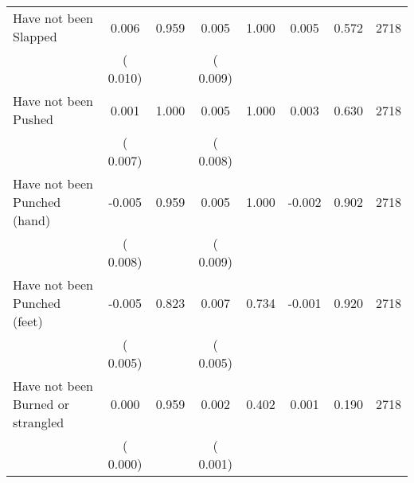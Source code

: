 \begin{tabular}{l*{7}{c}}
 Have not been Slapped       &              0.006       &        0.959  &              0.005       &        1.000  &              0.005       &              0.572 &  2718 \\ 
                       &       (       0.010)             &                               &       (       0.009)                     &                               &                                               &                                &                      \\ 

 Have not been Pushed       &              0.001       &        1.000  &              0.005       &        1.000  &              0.003       &              0.630 &  2718 \\ 
                       &       (       0.007)             &                               &       (       0.008)                     &                               &                                               &                                &                      \\ 

 Have not been Punched (hand)       &             -0.005       &        0.959  &              0.005       &        1.000  &             -0.002       &              0.902 &  2718 \\ 
                       &       (       0.008)             &                               &       (       0.009)                     &                               &                                               &                                &                      \\ 

 Have not been Punched (feet)       &             -0.005       &        0.823  &              0.007       &        0.734  &             -0.001       &              0.920 &  2718 \\ 
                       &       (       0.005)             &                               &       (       0.005)                     &                               &                                               &                                &                      \\ 

 Have not been Burned or strangled       &              0.000       &        0.959  &              0.002       &        0.402  &              0.001       &              0.190 &  2718 \\ 
                       &       (       0.000)             &                               &       (       0.001)                     &                               &                                               &                                &                      \\ 


\end{tabular}
